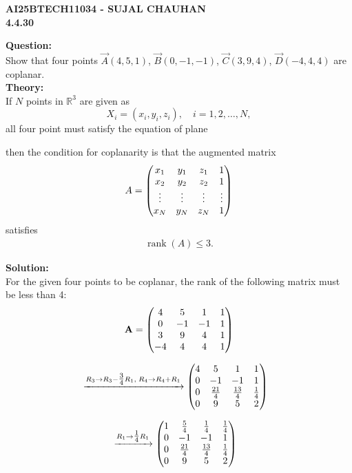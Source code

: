 \documentclass[12pt]{article}
\begin{document}
\newpage
\begin{center}
\textbf{\Large AI25BTECH11034 - SUJAL CHAUHAN }\\
\textbf{4.4.30}
\end{center}

\textbf{Question:}\\
Show that four points $\vec{A}(4,5,1)$, $\vec{B}(0,-1,-1)$, $\vec{C}(3,9,4)$, $\vec{D}(-4,4,4)$ are coplanar.\\[1cm]

\textbf{Theory:} \\

If $N$ points in $\mathbb{R}^3$ are given as 
\[
X_i = (x_i, y_i, z_i), \quad i = 1,2,\dots,N,
\] 
all four point must satisfy the equation of plane 

then the condition for coplanarity is that the augmented matrix
\begin{align}
A = \begin{pmatrix}
x_1 & y_1 & z_1 & 1 \\
x_2 & y_2 & z_2 & 1 \\
\vdots & \vdots & \vdots & \vdots \\
x_N & y_N & z_N & 1
\end{pmatrix}
\end{align}
satisfies
\begin{align}
\operatorname{rank}(A) \leq 3.
\end{align}



\textbf{Solution:} \\
For the given four points to be coplanar, the rank of the following matrix must be less than 4:
\begin{align}
\mathbf{A}=\begin{pmatrix} 
4 & 5 & 1 & 1\\
0 & -1 & -1 & 1 \\
3 & 9 & 4 & 1\\
-4 & 4 & 4 & 1 
\end{pmatrix}
\end{align}

\begin{align}
&\xrightarrow{R_3 \to R_3 - \tfrac{3}{4}R_1,\; R_4 \to R_4 + R_1}
\begin{pmatrix}
4 & 5 & 1 & 1 \\
0 & -1 & -1 & 1 \\
0 & \tfrac{21}{4} & \tfrac{13}{4} & \tfrac{1}{4} \\
0 & 9 & 5 & 2
\end{pmatrix}
\end{align}

\begin{align}
&\xrightarrow{R_1 \to \tfrac{1}{4}R_1}
\begin{pmatrix}
1 & \tfrac{5}{4} & \tfrac{1}{4} & \tfrac{1}{4} \\
0 & -1 & -1 & 1 \\
0 & \tfrac{21}{4} & \tfrac{13}{4} & \tfrac{1}{4} \\
0 & 9 & 5 & 2
\end{pmatrix}
\end{align}
\end{document}
